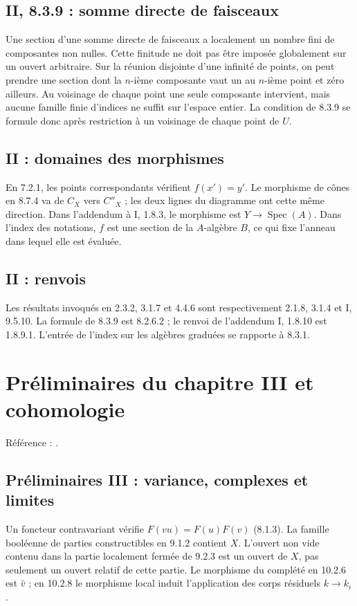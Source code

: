 \documentclass[11pt,a4paper]{article}
\begin{document}
\subsection{II, 8.3.9 : somme directe de faisceaux}
\label{note:base2-sheafsum}
Une section d'une somme directe de faisceaux a localement un
nombre fini de composantes non nulles. Cette finitude ne doit
pas être imposée globalement sur un ouvert arbitraire.
Sur la réunion disjointe d'une infinité de points, on peut
prendre une section dont la $n$-ième composante vaut un au
$n$-ième point et zéro ailleurs. Au voisinage de chaque point
une seule composante intervient, mais aucune famille finie
d'indices ne suffit sur l'espace entier.
La condition de 8.3.9 se formule donc après restriction à un
voisinage de chaque point de $U$.

\subsection{II : domaines des morphismes}
\label{note:base2-domains}
En 7.2.1, les points correspondants vérifient $f(x')=y'$.
Le morphisme de cônes en 8.7.4 va de $C_X$ vers $C''_X$ ;
les deux lignes du diagramme ont cette même direction.
Dans l'addendum à I, 1.8.3, le morphisme est
$Y\to\operatorname{Spec}(A)$. Dans l'index des notations,
$f$ est une section de la $A$-algèbre $B$, ce qui fixe
l'anneau dans lequel elle est évaluée.

\subsection{II : renvois}
\label{note:base2-refs}
Les résultats invoqués en 2.3.2, 3.1.7 et 4.4.6 sont
respectivement 2.1.8, 3.1.4 et I, 9.5.10.
La formule de 8.3.9 est 8.2.6.2 ; le renvoi de l'addendum
I, 1.8.10 est 1.8.9.1. L'entrée de l'index sur les algèbres
graduées se rapporte à 8.3.1.
\par

\section{Préliminaires du chapitre III et cohomologie}
\label{part:base3}
Référence : \cite{EGAIII1}.
\subsection{Préliminaires III : variance, complexes et limites}
\label{note:base3-complexes}
Un foncteur contravariant vérifie $F(vu)=F(u)F(v)$ (8.1.3).
La famille booléenne de parties constructibles en 9.1.2 contient
$X$. L'ouvert non vide contenu dans la partie localement fermée
de 9.2.3 est un ouvert de $X$, pas seulement un ouvert relatif
de cette partie. Le morphisme du complété en 10.2.6 est
$\widehat v$ ; en 10.2.8 le morphisme local induit l'application
des corps résiduels $k\to k_i$.
\end{document}
